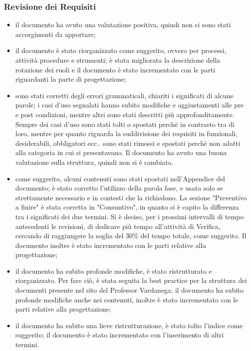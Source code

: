 \subsubsection{Revisione dei Requisiti}
\begin{itemize}
\item {} il documento ha avuto una valutazione positiva, quindi non ci sono stati accorgimenti da apportare;
\item {} il documento è stato riorganizzato come suggerito, ovvero per processi, attività procedure e strumenti; è stata migliorata la descrizione della rotazione dei ruoli e il documento è stato incrementato con le parti riguardanti la parte di progettazione;
\item {} sono stati corretti degli errori grammaticali, chiariti i significati di alcune parole; i casi d'uso segnalati hanno subito modifiche e aggiustamenti alle pre e post condizioni, mentre altri sono stati descritti più approfonditamente. Sempre dei casi d'uso sono stati tolti o spostati perchè in contrasto tra di loro, mentre per quanto riguarda la suddivisione dei requisiti in funzionali, desiderabili, obbligatori ecc.. sono stati rimossi e spostati perchè non adatti alla categoria in cui si presentavano. Il documento ha avuto una buona valutazione sulla struttura, quindi non si è cambiata.
\item {} come suggerito, alcuni contenuti sono stati spostati nell'Appendice del documento; è stato corretto l'utilizzo della parola fase, e usata solo se strettamente necessario e in contesti che la richiedono. La sezione "Preventivo a finire" è stata corretta in "Consuntivo", in quanto si è capito la differenza tra i significati dei due termini. Si è deciso, per i prossimi intervalli di tempo antecedenti le revisioni, di dedicare più tempo all'attività di Verifica, cercando di raggiungere la soglia del 30\% del tempo totale, come suggerito. Il documento inoltre è stato incrementato con le parti relative alla progettazione;
\item {}il documento ha subito profonde modifiche, è stato ristrutturato e riorganizzato. Per fare ciò, è stata seguita la best practice per la struttura dei documenti presente nel sito del Professor Vardanega; il documento ha subito profonde modifiche anche nei contenuti, inoltre è stato incrementato con le parti relative alla progettazione;
\item {}il documento ha subito una lieve ristrutturazione, è stato tolto l'indice come suggerito; il documento è stato incrementato con l'inserimento di altri termini.
\end{itemize}







